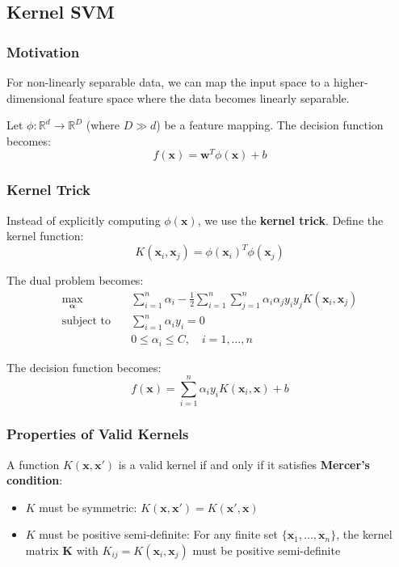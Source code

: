 \documentclass[12pt,a4paper]{article}
\begin{document}
\subsection{Kernel SVM}

\subsubsection{Motivation}
For non-linearly separable data, we can map the input space to a higher-dimensional feature space where the data becomes linearly separable.

Let $\phi: \mathbb{R}^d \rightarrow \mathbb{R}^D$ (where $D \gg d$) be a feature mapping. The decision function becomes:
\begin{equation}
f(\mathbf{x}) = \mathbf{w}^T\phi(\mathbf{x}) + b
\end{equation}

\subsubsection{Kernel Trick}
Instead of explicitly computing $\phi(\mathbf{x})$, we use the \textbf{kernel trick}. Define the kernel function:
\begin{equation}
K(\mathbf{x}_i, \mathbf{x}_j) = \phi(\mathbf{x}_i)^T\phi(\mathbf{x}_j)
\end{equation}

The dual problem becomes:
\begin{align}
\max_{\boldsymbol{\alpha}} \quad &\sum_{i=1}^n \alpha_i - \frac{1}{2}\sum_{i=1}^n\sum_{j=1}^n \alpha_i \alpha_j y_i y_j K(\mathbf{x}_i, \mathbf{x}_j) \\
\text{subject to} \quad &\sum_{i=1}^n \alpha_i y_i = 0 \\
&0 \leq \alpha_i \leq C, \quad i = 1, \ldots, n
\end{align}

The decision function becomes:
\begin{equation}
f(\mathbf{x}) = \sum_{i=1}^n \alpha_i y_i K(\mathbf{x}_i, \mathbf{x}) + b
\end{equation}

\subsubsection{Properties of Valid Kernels}
A function $K(\mathbf{x}, \mathbf{x}')$ is a valid kernel if and only if it satisfies \textbf{Mercer's condition}:
\begin{itemize}
    \item $K$ must be symmetric: $K(\mathbf{x}, \mathbf{x}') = K(\mathbf{x}', \mathbf{x})$
    \item $K$ must be positive semi-definite: For any finite set $\{\mathbf{x}_1, \ldots, \mathbf{x}_n\}$, the kernel matrix $\mathbf{K}$ with $K_{ij} = K(\mathbf{x}_i, \mathbf{x}_j)$ must be positive semi-definite
\end{itemize}
\end{document}
